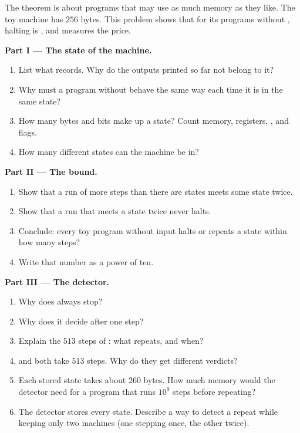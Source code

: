 \begin{problem}\label{pb:g12:halting-problem:1}
The theorem is about programs that may use as much memory as they like. The toy machine has $256$ bytes. This problem
shows that for its programs without , halting is , and measures the price.

\label{lst:g12:halting-problem:repeat}

\label{out:g12:halting-problem:repeat}

\medskip\noindent\textbf{Part I --- The state of the machine.}
\begin{enumerate}
  \item List what  records. Why do the outputs printed so far not belong to it?
  \item Why must a program without  behave the same way each time it is in the same state?
  \item How many bytes and bits make up a state? Count memory, registers, ,  and flags.
  \item How many different states can the machine be in?
\end{enumerate}

\medskip\noindent\textbf{Part II --- The bound.}
\begin{enumerate}[resume]
  \item Show that a run of more steps than there are states meets some state twice.
  \item Show that a run that meets a state twice never halts.
  \item Conclude: every toy program without input halts or repeats a state within how many steps?
  \item Write that number as a power of ten.
\end{enumerate}

\medskip\noindent\textbf{Part III --- The detector.}
\begin{enumerate}[resume]
  \item Why does  always stop?
  \item Why does it decide  after one step?
  \item Explain the $513$ steps of : what repeats, and when?
  \item {} and  both take $513$ steps. Why do they get different verdicts?
  \item Each stored state takes about $260$ bytes. How much memory would the detector need for a program that runs
    $10^9$ steps before repeating?
  \item The detector stores every state. Describe a way to detect a repeat while keeping only two machines (one
    stepping once, the other twice).
\end{enumerate}


\end{problem}
